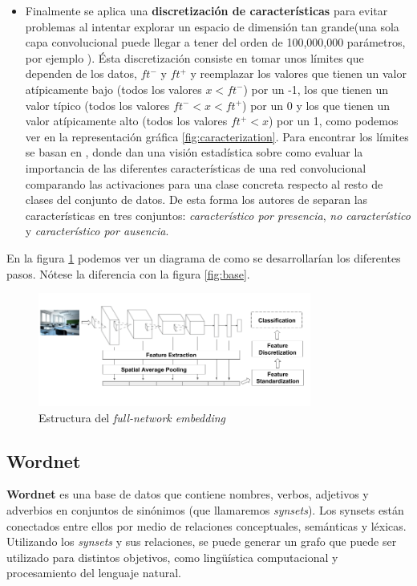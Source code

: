 \documentclass[12,twoside]{TFG-GM}
\theoremstyle{definition}
\theoremstyle{remark}
\begin{document}
\begin{itemize}
\item Finalmente se aplica una \textbf{discretización de características} para evitar problemas al intentar explorar un espacio de dimensión tan grande(una sola capa convolucional puede llegar a tener del orden de 100,000,000 parámetros, por ejemplo \cite{cnnexample}). Ésta discretización consiste en tomar unos límites que dependen de los datos, $ft^-$ y $ft^+$ y reemplazar los valores que tienen un valor atípicamente bajo (todos los valores $x < ft^-$) por un -1, los que tienen un valor típico (todos los valores $ ft^- < x < ft^+$) por un 0 y los que tienen un valor atípicamente alto (todos los valores $ ft^+ < x$) por un 1, como podemos ver en la representación gráfica \ref{fig:caracterization}. Para encontrar los límites se basan en \cite{behaviourcnn}, donde dan una visión estadística sobre como evaluar la importancia de las diferentes características de una red convolucional comparando las activaciones para una clase concreta respecto al resto de clases del conjunto de datos. De esta forma los autores de \cite{behaviourcnn} separan las características en tres conjuntos: \textit{característico por presencia}, \textit{no característico} y \textit{característico por ausencia}.
\end{itemize}


En la figura \ref{fig:fnediagram} podemos ver un diagrama de como se desarrollarían los diferentes pasos. Nótese la diferencia con la figura \ref{fig:base}.

\begin{figure}[h]
\label{fig:fne}
\centering
\includegraphics[width = 0.8\textwidth]{Images/cropfne.png} 
\caption{Estructura del \textit{full-network embedding}\label{fig:fnediagram}}
\end{figure}




\subsection{Wordnet}

\textbf{Wordnet} es una base de datos que contiene nombres, verbos, adjetivos y adverbios en conjuntos de sinónimos (que llamaremos \textit{synsets}). Los synsets están conectados entre ellos por medio de relaciones conceptuales, semánticas y léxicas. Utilizando los \textit{synsets} y sus relaciones, se puede generar un grafo que puede ser utilizado para distintos objetivos, como lingüística computacional y procesamiento del lenguaje natural. 
\end{document}
